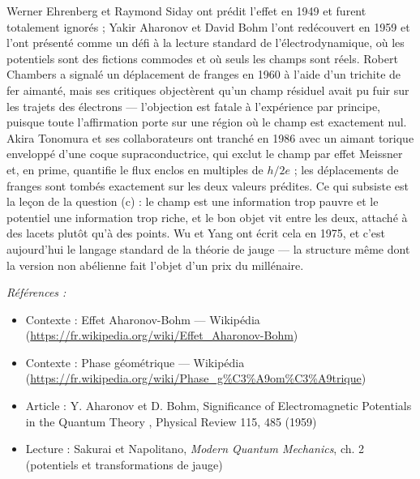 \documentclass[11pt]{article}
\newenvironment{refs}{\par\small\noindent\emph{Références :}\begin{itemize}\setlength\itemsep{0pt}}{\end{itemize}\normalsize}
\begin{document}
\noindent Werner Ehrenberg et Raymond Siday ont prédit l'effet en 1949 et furent
totalement ignorés ; Yakir Aharonov et David Bohm l'ont redécouvert en 1959 et l'ont présenté
comme un défi à la lecture standard de l'électrodynamique, où les potentiels sont des fictions
commodes et où seuls les champs sont réels. Robert Chambers a signalé un déplacement de franges en
1960 à l'aide d'un trichite de fer aimanté, mais ses critiques objectèrent qu'un champ résiduel
avait pu fuir sur les trajets des électrons --- l'objection est fatale à l'expérience par principe,
puisque toute l'affirmation porte sur une région où le champ est exactement nul. Akira Tonomura et
ses collaborateurs ont tranché en 1986 avec un aimant torique enveloppé d'une coque
supraconductrice, qui exclut le champ par effet Meissner et, en prime, quantifie le flux enclos
en multiples de $h/2e$ ; les déplacements de franges sont tombés exactement sur les deux valeurs
prédites. Ce qui subsiste est la leçon de la question (c) : le champ est une information trop
pauvre et le potentiel une information trop riche, et le bon objet vit entre les deux, attaché à
des lacets plutôt qu'à des points. Wu et Yang ont écrit cela en 1975, et c'est aujourd'hui le
langage standard de la théorie de jauge --- la structure même dont la version non abélienne fait
l'objet d'un prix du millénaire.

\begin{refs}
\item Contexte : Effet Aharonov-Bohm --- Wikipédia (\url{https://fr.wikipedia.org/wiki/Effet_Aharonov-Bohm})
\item Contexte : Phase géométrique --- Wikipédia (\url{https://fr.wikipedia.org/wiki/Phase_g%C3%A9om%C3%A9trique})
\item Article : Y. Aharonov et D. Bohm, \og{} Significance of Electromagnetic Potentials in the Quantum Theory \fg{}, Physical Review 115, 485 (1959)
\item Lecture : Sakurai et Napolitano, \textit{Modern Quantum Mechanics}, ch. 2 (potentiels et transformations de jauge)
\end{refs}

\bigskip
\end{document}
